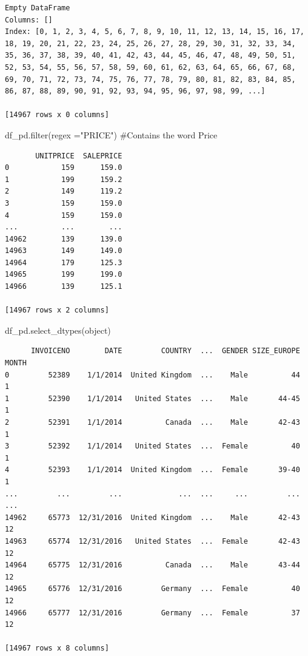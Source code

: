 \documentclass[
  letterpaper,
  DIV=11,
  numbers=noendperiod]{scrreprt}
\newenvironment{Shaded}{\begin{snugshade}}{\end{snugshade}}
\newcommand{\BuiltInTok}[1]{\textcolor[rgb]{0.00,0.23,0.31}{#1}}
\newcommand{\CommentTok}[1]{\textcolor[rgb]{0.37,0.37,0.37}{#1}}
\newcommand{\NormalTok}[1]{\textcolor[rgb]{0.00,0.23,0.31}{#1}}
\newcommand{\OperatorTok}[1]{\textcolor[rgb]{0.37,0.37,0.37}{#1}}
\newcommand{\StringTok}[1]{\textcolor[rgb]{0.13,0.47,0.30}{#1}}
\begin{document}
\begin{verbatim}
Empty DataFrame
Columns: []
Index: [0, 1, 2, 3, 4, 5, 6, 7, 8, 9, 10, 11, 12, 13, 14, 15, 16, 17, 18, 19, 20, 21, 22, 23, 24, 25, 26, 27, 28, 29, 30, 31, 32, 33, 34, 35, 36, 37, 38, 39, 40, 41, 42, 43, 44, 45, 46, 47, 48, 49, 50, 51, 52, 53, 54, 55, 56, 57, 58, 59, 60, 61, 62, 63, 64, 65, 66, 67, 68, 69, 70, 71, 72, 73, 74, 75, 76, 77, 78, 79, 80, 81, 82, 83, 84, 85, 86, 87, 88, 89, 90, 91, 92, 93, 94, 95, 96, 97, 98, 99, ...]

[14967 rows x 0 columns]
\end{verbatim}

\begin{Shaded}
\begin{Highlighting}[]
\NormalTok{df\_pd.}\BuiltInTok{filter}\NormalTok{(regex }\OperatorTok{=}\StringTok{"PRICE"}\NormalTok{) }\CommentTok{\#Contains the word Price}
\end{Highlighting}
\end{Shaded}

\begin{verbatim}
       UNITPRICE  SALEPRICE
0            159      159.0
1            199      159.2
2            149      119.2
3            159      159.0
4            159      159.0
...          ...        ...
14962        139      139.0
14963        149      149.0
14964        179      125.3
14965        199      199.0
14966        139      125.1

[14967 rows x 2 columns]
\end{verbatim}

\begin{Shaded}
\begin{Highlighting}[]
\NormalTok{df\_pd.select\_dtypes(}\StringTok{\textquotesingle{}object\textquotesingle{}}\NormalTok{)}
\end{Highlighting}
\end{Shaded}

\begin{verbatim}
      INVOICENO        DATE         COUNTRY  ...  GENDER SIZE_EUROPE MONTH
0         52389    1/1/2014  United Kingdom  ...    Male          44     1
1         52390    1/1/2014   United States  ...    Male       44-45     1
2         52391    1/1/2014          Canada  ...    Male       42-43     1
3         52392    1/1/2014   United States  ...  Female          40     1
4         52393    1/1/2014  United Kingdom  ...  Female       39-40     1
...         ...         ...             ...  ...     ...         ...   ...
14962     65773  12/31/2016  United Kingdom  ...    Male       42-43    12
14963     65774  12/31/2016   United States  ...  Female       42-43    12
14964     65775  12/31/2016          Canada  ...    Male       43-44    12
14965     65776  12/31/2016         Germany  ...  Female          40    12
14966     65777  12/31/2016         Germany  ...  Female          37    12

[14967 rows x 8 columns]
\end{verbatim}
\end{document}
